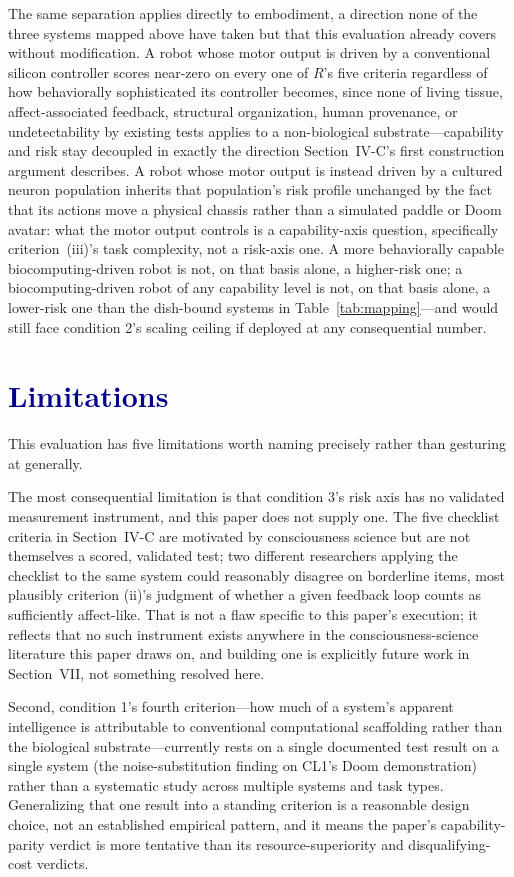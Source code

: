 \documentclass[journal]{IEEEtran}
\begin{document}
The same separation applies directly to embodiment, a direction none of the three
systems mapped above have taken but that this evaluation already covers without
modification. A robot whose motor output is driven by a conventional silicon
controller scores near-zero on every one of $R$'s five criteria regardless of how
behaviorally sophisticated its controller becomes, since none of living tissue,
affect-associated feedback, structural organization, human provenance, or
undetectability by existing tests applies to a non-biological substrate---capability
and risk stay decoupled in exactly the direction Section~IV-C's first construction
argument describes. A robot whose motor output is instead driven by a cultured
neuron population inherits that population's risk profile unchanged by the fact
that its actions move a physical chassis rather than a simulated paddle or Doom
avatar: what the motor output controls is a capability-axis question, specifically
criterion~(iii)'s task complexity, not a risk-axis one. A more behaviorally capable
biocomputing-driven robot is not, on that basis alone, a higher-risk one; a
biocomputing-driven robot of any capability level is not, on that basis alone, a
lower-risk one than the dish-bound systems in Table~\ref{tab:mapping}---and would
still face condition 2's scaling ceiling if deployed at any consequential number.

\section{\textcolor{darkblue}{Limitations}}

This evaluation has five limitations worth naming precisely rather than gesturing at
generally.

The most consequential limitation is that condition 3's risk axis has no validated
measurement instrument, and this paper does not supply one. The five checklist
criteria in Section~IV-C are motivated by consciousness science but are not
themselves a scored, validated test; two different researchers applying the
checklist to the same system could reasonably disagree on borderline items, most
plausibly criterion (ii)'s judgment of whether a given feedback loop counts as
sufficiently affect-like. That is not a flaw specific to this paper's execution; it
reflects that no such instrument exists anywhere in the consciousness-science
literature this paper draws on, and building one is explicitly future work in
Section~VII, not something resolved here.

Second, condition 1's fourth criterion---how much of a system's apparent
intelligence is attributable to conventional computational scaffolding rather than
the biological substrate---currently rests on a single documented test result on a
single system (the noise-substitution finding on CL1's Doom demonstration) rather
than a systematic study across multiple systems and task types. Generalizing that
one result into a standing criterion is a reasonable design choice, not an
established empirical pattern, and it means the paper's capability-parity verdict is
more tentative than its resource-superiority and disqualifying-cost verdicts.
\end{document}
